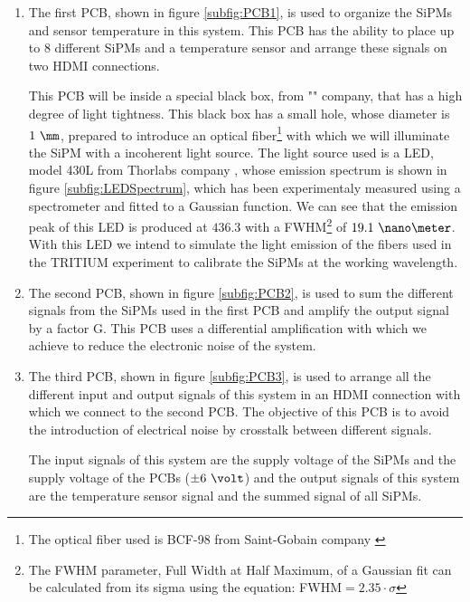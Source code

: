\begin{enumerate}
\item{} The first PCB, shown in figure \ref{subfig:PCB1}, is used to organize the SiPMs and sensor temperature in this system. This PCB has the ability to place up to 8 different SiPMs and a temperature sensor and arrange these signals on two HDMI connections.

This PCB will be inside a special black box, from "" company, that has a high degree of light tightness. This black box has a small hole, whose diameter is $1~\mm$, prepared to introduce an optical fiber\footnote{The optical fiber used is BCF-98 from Saint-Gobain company \cite{OpticalFibers}} with which we will illuminate the SiPM with a incoherent light source. The light source used is a LED, model 430L from Thorlabs company \cite{LEDThorlabs}, whose emission spectrum is shown in figure \ref{subfig:LEDSpectrum}, which has been experimentaly measured using a spectrometer and fitted to a Gaussian function. We can see that the emission peak of this LED is produced at $436.3$ with a FWHM\footnote{The FWHM parameter, Full Width at Half Maximum, of a Gaussian fit can be calculated from its sigma using the equation: FWHM$=2.35 \cdot{} \sigma$} of $19.1~\nano\meter$. With this LED we intend to simulate the light emission of the fibers used in the TRITIUM experiment to calibrate the SiPMs at the working wavelength. 

\item{} The second PCB, shown in figure \ref{subfig:PCB2}, is used to sum the different signals from the SiPMs used in the first PCB and amplify the output signal by a factor G. This PCB uses a differential amplification with which we achieve to reduce the electronic noise of the system.

\item{} The third PCB, shown in figure \ref{subfig:PCB3}, is used to arrange all the different input and output signals of this system in an HDMI connection with which we connect to the second PCB. The objective of this PCB is to avoid the introduction of electrical noise by crosstalk between different signals.

The input signals of this system are the supply voltage of the SiPMs and the supply voltage of the PCBs ($\pm 6~\volt$) and the output signals of this system are the temperature sensor signal and the summed signal of all SiPMs. 

\end{enumerate}

